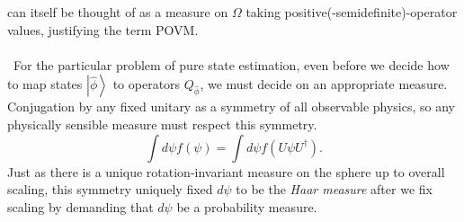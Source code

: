 \documentclass[11pt,letterpaper]{article}
\newcommand{\KET}[1]{\left| #1 \right\rangle }
\begin{document}
can itself be thought of as a measure on $\Omega$ taking positive(-semidefinite)-operator values, justifying the term POVM.\\
\\
\
For the particular problem of pure state estimation, even before we decide how to map states $\KET{\hat{\phi}}$ to operators $Q_{\hat{\phi}}$, we must decide on an appropriate measure. Conjugation by any fixed unitary as a symmetry of all observable physics, so any physically sensible measure must respect this symmetry. \begin{equation}
\int d \psi f(\psi) = \int d \psi f( U \psi U^\dagger).
\end{equation}
Just as there is a unique rotation-invariant measure on the sphere up to overall scaling, this symmetry uniquely fixed $d \psi$ to be the \textit{Haar measure} after we fix scaling by demanding that $d \psi$ be a probability measure.
\end{document}
